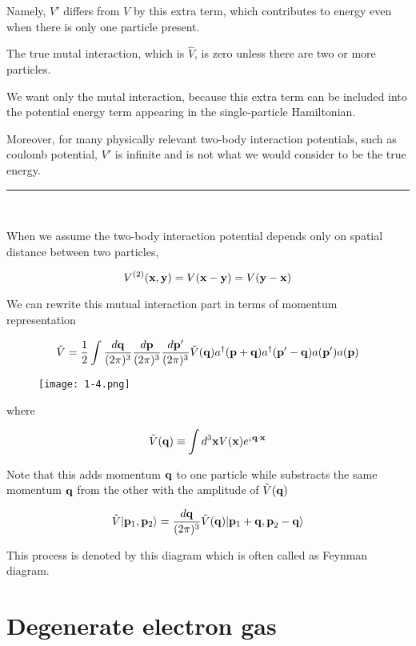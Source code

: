 Namely, $V'$ differs from $V$ by this extra term, which contributes to energy even when there is only one particle present. 

The true mutal interaction, which is $\hat{V}$, is zero unless there are two or more particles. 

We want only the mutal interaction, because this extra term can be included into the potential energy term appearing in the single-particle Hamiltonian. 

Moreover, for many physically relevant two-body interaction potentials, such as coulomb potential, $V'$ is infinite and is not what we would consider to be the true energy. 

\hrule

\ 

When we assume the two-body interaction potential depends only on spatial distance between two particles, 

\[V^{(2)}({\bf x,y}) = V({\bf x-y}) = V({\bf y-x}) \]

We can rewrite this mutual interaction part in terms of momentum representation

\begin{align}
\hat{V} = \frac{1}{2}\int\frac{d\bf q}{(2\pi)^3}\frac{d\bf p}{(2\pi)^3}\frac{d\bf p'}{(2\pi)^3}\tilde{V}({\bf q})a^\dagger({\bf p+q})a^\dagger({\bf p'-q})a({\bf p'})a({\bf p})
\end{align}

\begin{wrapfigure}{r}{5.5cm}
\texttt{[image: 1-4.png]}
\end{wrapfigure}

where

\[\tilde{V}({\bf q})\equiv\int d^3{\bf x}V({\bf x})e^{_i\bf q\cdot x} \]

Note that this adds momentum $\bf q$ to one particle while substracts the same momentum $\bf q$ from the other with the amplitude of $\tilde{V}({\bf q})$

\begin{align}
\hat{V}|{\bf p}_1,{\bf p}_2\rangle = \frac{d\bf q}{(2\pi)^3}\tilde{V}({\bf q})|{\bf p}_1+{\bf q,p}_2-{\bf q}\rangle
\end{align}

This process is denoted by this diagram which is often called as Feynman diagram. 

\section{Degenerate electron gas}


